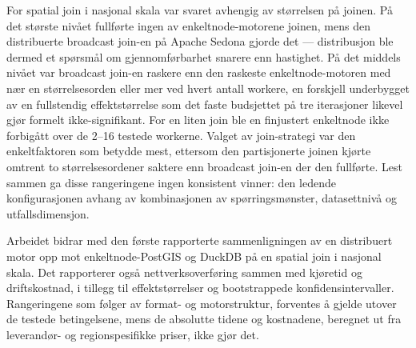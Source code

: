 For spatial join i nasjonal skala var svaret avhengig av størrelsen på joinen. På det største nivået fullførte ingen av enkeltnode-motorene joinen, mens den distribuerte broadcast join-en på Apache Sedona gjorde det — distribusjon ble dermed et spørsmål om gjennomførbarhet snarere enn hastighet. På det middels nivået var broadcast join-en raskere enn den raskeste enkeltnode-motoren med nær en størrelsesorden eller mer ved hvert antall workere, en forskjell underbygget av en fullstendig effektstørrelse som det faste budsjettet på tre iterasjoner likevel gjør formelt ikke-signifikant. For en liten join ble en finjustert enkeltnode ikke forbigått over de 2--16 testede workerne. Valget av join-strategi var den enkeltfaktoren som betydde mest, ettersom den partisjonerte joinen kjørte omtrent to størrelsesordener saktere enn broadcast join-en der den fullførte. Lest sammen ga disse rangeringene ingen konsistent vinner: den ledende konfigurasjonen avhang av kombinasjonen av spørringsmønster, datasettnivå og utfallsdimensjon.

Arbeidet bidrar med den første rapporterte sammenligningen av en distribuert motor opp mot enkeltnode-PostGIS og DuckDB på en spatial join i nasjonal skala. Det rapporterer også nettverksoverføring sammen med kjøretid og driftskostnad, i tillegg til effektstørrelser og bootstrappede konfidensintervaller. Rangeringene som følger av format- og motorstruktur, forventes å gjelde utover de testede betingelsene, mens de absolutte tidene og kostnadene, beregnet ut fra leverandør- og regionspesifikke priser, ikke gjør det.